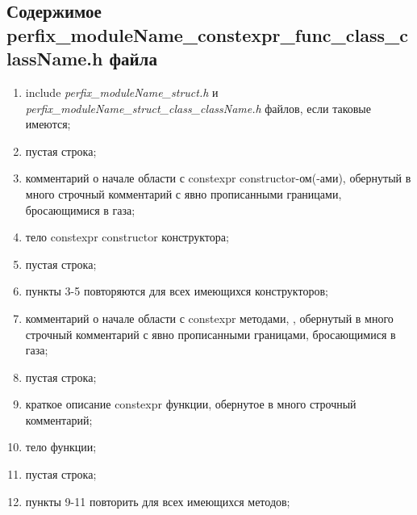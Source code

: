 \subsection{Содержимое perfix\-\_moduleName\-\_constexpr\-\_func\-\_class\-\_class\-Name.h файла}\label{p:conf:ch}
\begin{enumerate}
	\item include \textit{perfix\_moduleName\_struct.h} и \textit{perfix\_moduleName\_struct\_class\_className.h} файлов, если таковые имеются;
	\item пустая строка;
	\item комментарий о начале области с constexpr constructor-ом(-ами), обернутый в много строчный комментарий с явно прописанными границами, бросающимися в газа;
	\item тело constexpr constructor конструктора;
	\item пустая строка;
	\item пункты 3-5 повторяются для всех имеющихся конструкторов;
	\item комментарий о начале области с constexpr методами, , обернутый в много строчный комментарий с явно прописанными границами, бросающимися в газа;
	\item пустая строка;
	\item краткое описание constexpr функции, обернутое в много строчный комментарий;
	\item тело функции;
	\item пустая строка;
	\item пункты 9-11 повторить для всех имеющихся методов;
	
\end{enumerate}
